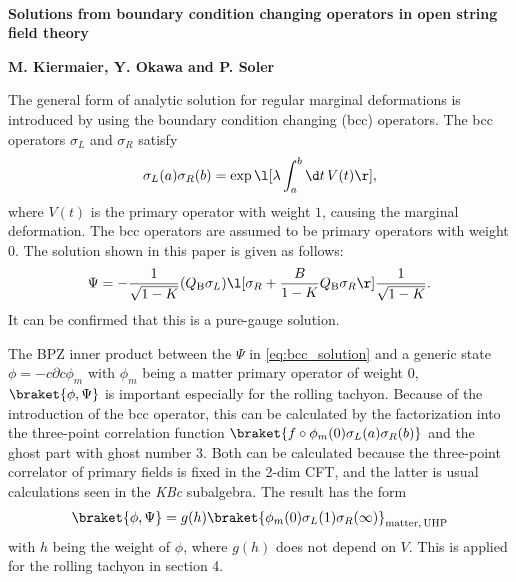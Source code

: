 \documentclass[12pt]{article}
\date{}
\begin{document}
{\Large{}\\[2mm]
\textbf{Solutions from boundary condition changing operators in open string field theory\cite{Kiermaier:2010cf}
}
}

\noindent
\hfill
\textbf{M. Kiermaier, Y. Okawa and P. Soler}%

\vspace{12pt}
The general form of analytic solution for regular marginal deformations is introduced by using the boundary condition changing (bcc) operators.
The bcc operators $\sigma_L$ and $\sigma_R$ satisfy
\begin{align}
	\sigma_L(a)\sigma_R(b) = \exp\l[\lambda\int_a^b\d t\,V(t) \r],
\end{align}
where $V(t)$ is the primary operator with weight $1$, causing the marginal deformation.
The bcc operators are assumed to be primary operators with weight $0$.
The solution shown in this paper is given as follows:
\begin{align}
	\Psi = -\frac{1}{\sqrt{1-K}}(Q_\mathrm{B}\sigma_L)
	\l[
	\sigma_R + \frac{B}{1-K}Q_\mathrm{B}\sigma_R
	\r]
	\frac{1}{\sqrt{1-K}}.\label{eq:bcc_solution}
\end{align}
It can be confirmed that this is a pure-gauge solution.

The BPZ inner product between the $\Psi$ in \eqref{eq:bcc_solution} and a generic state $\phi = -c\partial c\phi_m$ with $\phi_m$ being a matter primary operator of weight $0$, $\braket{\phi,\Psi}$ is important especially for the rolling tachyon.
Because of the introduction of the bcc operator, this can be calculated by the factorization into the three-point correlation function $\braket{f\circ \phi_m(0)\sigma_L(a)\sigma_R(b)}$ and the ghost part with ghost number $3$.
Both can be calculated because the three-point correlator of primary fields is fixed  in the 2-dim CFT, and the latter is usual calculations seen in the \textit{KBc} subalgebra.
The result has the form
\begin{align}
	\braket{\phi,\Psi} = g(h) \braket{\phi_m(0)\sigma_L(1)\sigma_R(\infty)}_{\mathrm{matter,\,UHP}}
\end{align}
with $h$ being the weight of $\phi$, where $g(h)$ does not depend on $V$.
This is applied for the rolling tachyon in section 4.



%
 

\end{document}
